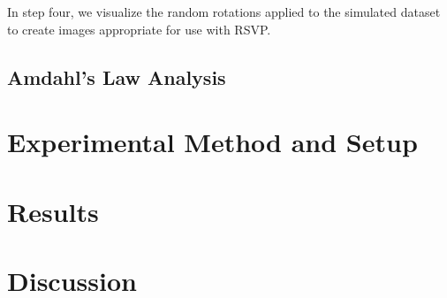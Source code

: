 \documentclass[12pt, letterpaper]{article}
\begin{document}
In step four, we visualize the random rotations applied to the simulated dataset to create images 
appropriate for use with RSVP.

\subsection{Amdahl's Law Analysis}





\section{Experimental Method and Setup}



\section{Results}

\section{Discussion}





\end{document}
